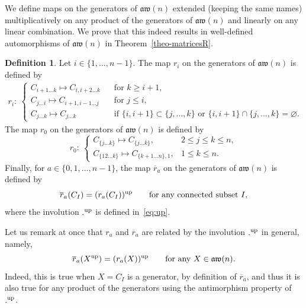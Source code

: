 \documentclass[pdftex]{sigma}
\numberwithin{equation}{section}
\theoremstyle{definition}
\newtheorem{defi}[theo]{Definition}
\newcommand{\rb}{\overline{r}}
\newcommand{\aw}{\mathfrak{aw}(n)}
\begin{document}
We define maps on the generators of $\aw$ extended (keeping the same names) multiplicatively on any product of the generators of $\aw$
and linearly on any linear combination. We prove that this indeed results in well-defined automorphisms of $\aw$ in Theorem~\ref{theo-matricesR}.
 \begin{defi}\label{def:rrb} Let $i\in\{1,\dots,n-1 \}$. The map $r_i$ on the generators of $\aw$ is defined by
\begin{gather}\label{def-rig}
r_i\colon \ \begin{cases}
C_{i+1\dots k} \mapsto C_{i,i+2\dots k} & \text{for }k\geq i+1 ,\\
C_{j \dots i} \mapsto C_{i+1,i-1\dots j} \quad & \text{for }j\leq i ,\\
 C_{j\dots k} \mapsto C_{j\dots k} & \text{if $\{i,i+1\}\subset \{j,\dots,k\}$ or $\{i,i+1\}\cap \{j,\dots,k\}=\varnothing$.}
\end{cases}
\end{gather}
The map $r_0$ on the generators of $\aw$ is defined by
\begin{equation*}%
r_0\colon \
\begin{cases}
C_{\{j\dots k\}}\mapsto C_{\{j\dots k\}} ,& 2\leq j\leq k\leq n , \\
C_{\{12\dots k\}}\mapsto C_{\{k+1\dots n\},1} ,& 1\leq k\leq n .
\end{cases}
\end{equation*}
Finally, for $a\in\{0,1,\dots,n-1\}$, the map $\rb_a$ on the generators of $\aw$ is defined by
\begin{equation*}%
 \rb_a(C_I)=(r_a(C_I))^{\rm up}\qquad \text{for any connected subset $I$,}
\end{equation*}
where the involution ${.}^{\rm up}$ is defined in~\eqref{eq:up}.
\end{defi}
Let us remark at once that $r_a$ and $\rb_a$ are related by the involution ${.}^{\rm up}$ in general, namely,
\begin{equation}\label{shifti}
 \rb_a(X^{\rm up})=(r_a(X))^{\rm up} \qquad \text{for any $X\in\aw$.}
\end{equation}
Indeed, this is true when $X=C_I$ is a generator, by definition of $\rb_a$, and thus it is also true for any product of the generators using the antimorphism property of ${.}^{\rm up}$.
\end{document}
